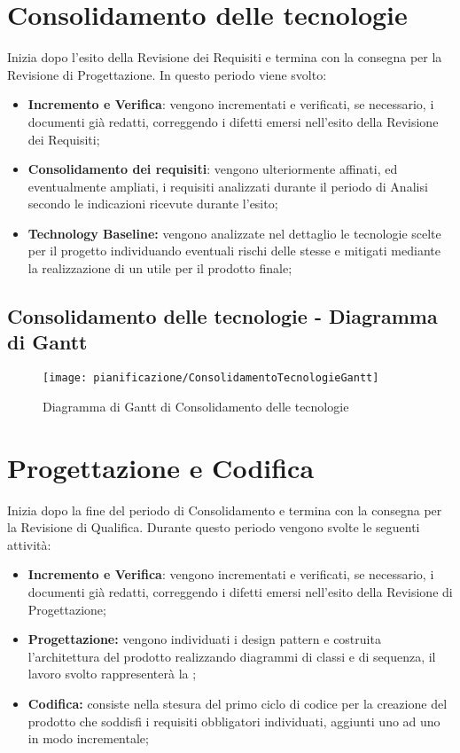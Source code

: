 \documentclass[../PianodiProgetto.tex]{subfiles}
\begin{document}
	\section{Consolidamento delle tecnologie} Inizia dopo l'esito della Revisione dei Requisiti e termina con la consegna per la Revisione di Progettazione. In questo periodo viene svolto:

	\begin{itemize}	
		\item \textbf{Incremento e Verifica}: vengono incrementati e verificati, se necessario, i documenti già redatti, correggendo i difetti emersi nell'esito della Revisione dei Requisiti;
		\item \textbf{Consolidamento dei requisiti}: vengono ulteriormente affinati, ed eventualmente ampliati, i requisiti analizzati durante il periodo di Analisi secondo le indicazioni ricevute durante l'esito;
		\item \textbf{Technology Baseline:} vengono analizzate nel dettaglio le tecnologie scelte per il progetto individuando eventuali rischi delle stesse e mitigati mediante la realizzazione di un  utile per il prodotto finale;
	\end{itemize}

	\subsection{Consolidamento delle tecnologie - Diagramma di Gantt}
	\begin{figure}[H]
		\texttt{[image: pianificazione/ConsolidamentoTecnologieGantt]}	
		\caption{Diagramma di Gantt di Consolidamento delle tecnologie}\label{fig:3}
	\end{figure}
	\newpage
	\section{Progettazione e Codifica}
	Inizia dopo la fine del periodo di Consolidamento e termina con la consegna per la Revisione di Qualifica. Durante questo periodo vengono svolte le seguenti attività:
	\begin{itemize}
		\item \textbf{Incremento e Verifica}: vengono incrementati e verificati, se necessario, i documenti già redatti, correggendo i difetti emersi nell'esito della Revisione di Progettazione;	
		\item \textbf{Progettazione:} vengono individuati i design pattern e costruita l'architettura del prodotto realizzando diagrammi di classi e di sequenza, il lavoro svolto rappresenterà la ;
		\item \textbf{Codifica:} consiste nella stesura del primo ciclo di codice per la creazione del prodotto che soddisfi i requisiti obbligatori individuati, aggiunti uno ad uno in modo incrementale;
	\end{itemize}
\end{document}
